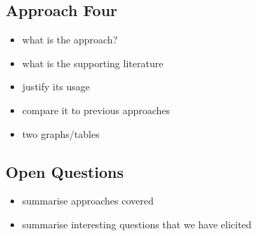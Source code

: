 \subsection{Approach Four}

\begin{itemize}
  \item what is the approach?
  \item what is the supporting literature
  \item justify its usage
  \item compare it to previous approaches
  \item two graphs/tables
\end{itemize}

\subsection{Open Questions}

\begin{itemize}
  \item summarise approaches covered
  \item summarise interesting questions that we have elicited
\end{itemize}

